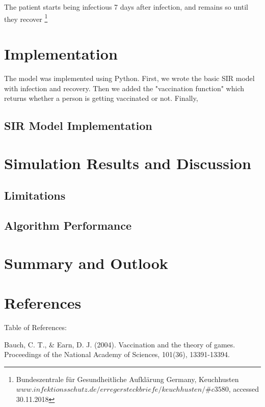 \documentclass[11pt]{article}
\begin{document}
The patient starts being infectious 7 days after infection, and remains so until they recover \footnote{Bundeszentrale für Gesundheitliche Aufklärung Germany, Keuchhusten \break
$www.infektionsschutz.de/erregersteckbriefe/keuchhusten/\#c3580$, accessed 30.11.2018}

\section{Implementation}
The model was implemented using Python. First, we wrote the basic SIR model with infection and recovery. Then we added the "vaccination function" which returns whether a person is getting vaccinated or not. Finally, 

\vspace{14px}



\subsection{SIR Model Implementation}


\section{Simulation Results and Discussion}

\subsection{Limitations}

\subsection{Algorithm Performance}

\section{Summary and Outlook}

\section{References}
Table of References: 
\vspace{14px}

Bauch, C. T., \& Earn, D. J. (2004). Vaccination and the theory of games. Proceedings of the National Academy of Sciences, 101(36), 13391-13394.
\vspace{14px}
\end{document}

